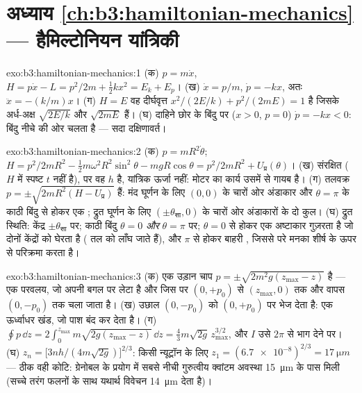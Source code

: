 \section*{अध्याय \ref{ch:b3:hamiltonian-mechanics} --- हैमिल्टोनियन यांत्रिकी}

\begin{solution}{exo:b3:hamiltonian-mechanics:1}
(क) $p = m\dot x$, $H = p\dot x - L = p^2/2m + \tfrac12 kx^2 = E_k +
E_p$। (ख) $\dot x = p/m$, $\dot p = -kx$, अतः $\ddot x = -(k/m)x$।
(ग) $H = E$ वह दीर्घवृत्त $x^2/(2E/k) + p^2/(2mE) = 1$ है जिसके अर्ध-अक्ष
$\sqrt{2E/k}$ और $\sqrt{2mE}$ हैं। (घ) दाहिने छोर के बिंदु पर ($x > 0$,
$p = 0$) $\dot p = -kx < 0$: बिंदु नीचे की ओर चलता है --- सदा
दक्षिणावर्त।
\end{solution}

\begin{solution}{exo:b3:hamiltonian-mechanics:2}
(क) $p = mR^2\dot\theta$; $H = p^2/2mR^2 - \tfrac12 m\omega^2R^2
\sin^2\theta - mgR\cos\theta = p^2/2mR^2 + U_{\text{प्र}}(\theta)$।
(ख) संरक्षित ($H$ में स्पष्ट $t$ नहीं है), पर वह $h$ है, यांत्रिक
ऊर्जा नहीं: मोटर का कार्य उसमें से गायब है। (ग) तलवक्र
$p = \pm\sqrt{2mR^2(H - U_{\text{प्र}})}$ हैं: मंद
घूर्णन के लिए $(0, 0)$ के चारों ओर अंडाकार और
$\theta = \pi$ के काठी बिंदु से होकर एक ; द्रुत घूर्णन के
लिए $(\pm\theta_{\text{सा}}, 0)$ के चारों ओर अंडाकारों के दो कुल। (घ)
द्रुत स्थिति: केंद्र
$\pm\theta_{\text{सा}}$ पर; काठी बिंदु $\theta = 0$ \emph{और} $\theta =
\pi$ पर; $\theta = 0$ से होकर एक अष्टाकार  गुज़रता है
जो दोनों केंद्रों को घेरता है ( तल को लाँघ जाते हैं), और
$\pi$ से होकर बाहरी , जिससे परे मनका शीर्ष के ऊपर से
परिक्रमा करता है।
\end{solution}

\begin{solution}{exo:b3:hamiltonian-mechanics:3}
(क) एक उड़ान चाप $p = \pm\sqrt{2m^2g(z_{\max} - z)}$ है --- एक
परवलय, जो अपनी बगल पर लेटा है और जिस पर $(0, +p_0)$ से
$(z_{\max}, 0)$ तक और वापस $(0, -p_0)$ तक चला जाता है। (ख) उछाल
$(0, -p_0)$ को $(0, +p_0)$ पर भेज देता है: एक ऊर्ध्वाधर खंड, जो पाश
बंद कर देता है। (ग)
$\oint p\,\dd z = 2\int_0^{z_{\max}}m\sqrt{2g(z_{\max} - z)}\,\dd z =
\tfrac43 m\sqrt{2g}\,z_{\max}^{3/2}$, और $I$ उसे $2\pi$ से भाग देने पर। (घ)
$z_n = \big[3nh/(4m\sqrt{2g})\big]^{2/3}$: किसी न्यूट्रॉन के लिए $z_1 =
(\num{6.7e-8})^{2/3} = \qty{17}{\micro m}$ --- ठीक वही कोटि: ग्रेनोबल
के प्रयोग में सबसे नीची गुरुत्वीय क्वांटम अवस्था
\qty{15}{\micro m} के पास मिली (सच्चे तरंग फलनों के साथ यथार्थ विवेचन
\qty{14}{\micro m} देता है)।
\end{solution}

